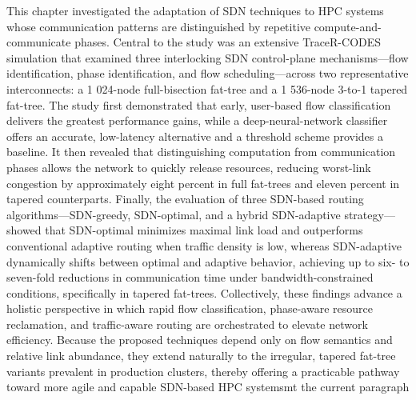 This chapter investigated the adaptation of SDN techniques to HPC systems whose
communication patterns are distinguished by repetitive compute-and-communicate
phases. Central to the study was an extensive TraceR-CODES simulation that
examined three interlocking SDN control-plane mechanisms—flow identification,
phase identification, and flow scheduling—across two representative
interconnects: a 1 024-node full-bisection fat-tree and a 1 536-node 3-to-1
tapered fat-tree. The study first demonstrated that early, user-based flow
classification delivers the greatest performance gains, while a
deep-neural-network classifier offers an accurate, low-latency alternative and a
threshold scheme provides a baseline. It then revealed that distinguishing
computation from communication phases allows the network to quickly release
resources, reducing worst-link congestion by approximately eight percent in full
fat-trees and eleven percent in tapered counterparts. Finally, the evaluation of
three SDN-based routing algorithms—SDN-greedy, SDN-optimal, and a hybrid
SDN-adaptive strategy—showed that SDN-optimal minimizes maximal link load and
outperforms conventional adaptive routing when traffic density is low, whereas
SDN-adaptive dynamically shifts between optimal and adaptive behavior, achieving
up to six- to seven-fold reductions in communication time under
bandwidth-constrained conditions, specifically in tapered fat-trees.
Collectively, these findings advance a holistic perspective in which rapid flow
classification, phase-aware resource reclamation, and traffic-aware routing are
orchestrated to elevate network efficiency. Because the proposed techniques
depend only on flow semantics and relative link abundance, they extend naturally
to the irregular, tapered fat-tree variants prevalent in production clusters,
thereby offering a practicable pathway toward more agile and capable SDN-based
HPC systemsmt the current paragraph
